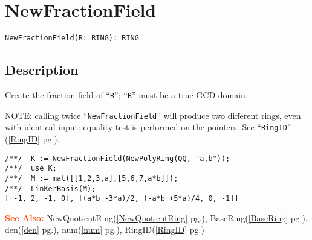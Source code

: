 \documentclass[a4paper]{mybook}
\newenvironment{command}{}{} %
\newcommand\SeeAlso{\par\textcolor{OrangeRed}{\textbf{\large See Also: }}}
\begin{document}
\section{NewFractionField}
\label{NewFractionField}
\begin{command} %


\begin{Verbatim}[label=syntax, rulecolor=\color{MidnightBlue},
frame=single]
NewFractionField(R: RING): RING
\end{Verbatim}


\subsection*{Description}

Create the fraction field of ``\verb&R&''; ``\verb&R&'' must be a true GCD domain.
\par 
NOTE: calling twice ``\verb&NewFractionField&'' will produce
two different rings, even with identical input: equality test is
performed on the pointers.  See ``\verb&RingID&'' (\ref{RingID} pg.\pageref{RingID}).
\begin{Verbatim}[label=example, rulecolor=\color{PineGreen}, frame=single]
/**/  K := NewFractionField(NewPolyRing(QQ, "a,b"));
/**/  use K;
/**/  M := mat([[1,2,3,a],[5,6,7,a*b]]);
/**/  LinKerBasis(M);
[[-1, 2, -1, 0], [(a*b -3*a)/2, (-a*b +5*a)/4, 0, -1]]
\end{Verbatim}


\SeeAlso %
  NewQuotientRing(\ref{NewQuotientRing} pg.\pageref{NewQuotientRing}), 
    BaseRing(\ref{BaseRing} pg.\pageref{BaseRing}), 
    den(\ref{den} pg.\pageref{den}), 
    num(\ref{num} pg.\pageref{num}), 
    RingID(\ref{RingID} pg.\pageref{RingID})
\end{command} %
\end{document}
